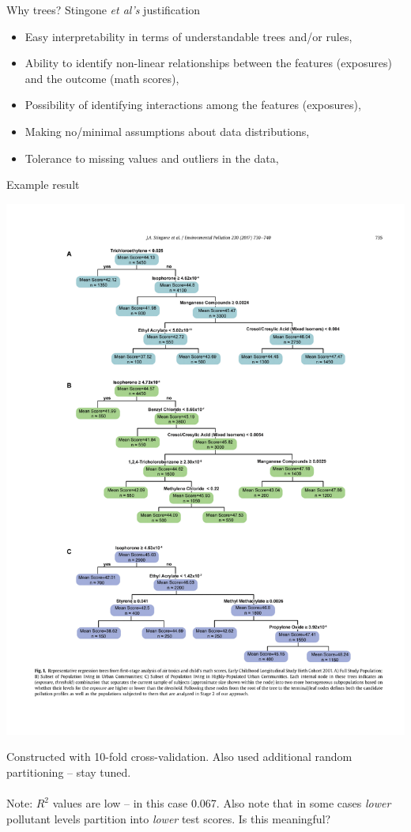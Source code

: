 \documentclass[mathserif, aspectratio=169]{beamer}
\begin{document}
\begin{frame}{Why trees?  Stingone \textit{et al's} justification}

\begin{itemize}
\item Easy interpretability in terms of understandable trees and/or rules, 
\item Ability to identify non-linear relationships between the features (exposures) and the outcome (math scores), 
\item Possibility of identifying interactions among the features (exposures), 
\item Making no/minimal assumptions about data distributions, 
\item Tolerance to missing values and outliers in the data, 
\end{itemize}
\end{frame}

\begin{frame}{Example result}

\includegraphics[width=\textwidth]{stingone_tree_totalpop}

Constructed with 10-fold cross-validation.  Also used additional random partitioning -- stay tuned.\\~\\

Note: $R^2$ values are low -- in this case 0.067.  Also note that in some cases \textit{lower} pollutant levels partition into \textit{lower} test scores.  Is this meaningful?
\end{frame}
\end{document}
